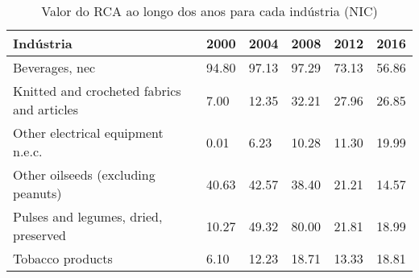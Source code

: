 \begin{table}
\centering
\caption{Valor do RCA ao longo dos anos para cada indústria (NIC)}
\label{tab:ex3-tempo-NIC}
\begin{tabular}{p{6cm}p{1.5cm}p{1.5cm}p{1.5cm}p{1.5cm}p{1.5cm}}
\toprule
                                 Indústria &  2000 &  2004 &  2008 &  2012 &  2016 \\
\midrule
                            Beverages, nec & 94.80 & 97.13 & 97.29 & 73.13 & 56.86 \\
Knitted and crocheted fabrics and articles &  7.00 & 12.35 & 32.21 & 27.96 & 26.85 \\
         Other electrical equipment n.e.c. &  0.01 &  6.23 & 10.28 & 11.30 & 19.99 \\
        Other oilseeds (excluding peanuts) & 40.63 & 42.57 & 38.40 & 21.21 & 14.57 \\
      Pulses and legumes, dried, preserved & 10.27 & 49.32 & 80.00 & 21.81 & 18.99 \\
                          Tobacco products &  6.10 & 12.23 & 18.71 & 13.33 & 18.81 \\
\bottomrule
\end{tabular}
\end{table}
